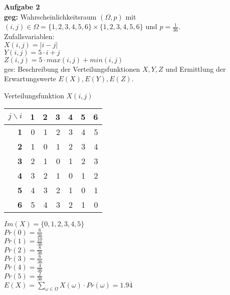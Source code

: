 \documentclass[a4paper]{scrartcl}
\begin{document}
	\begin{flushleft}
		\textbf{Aufgabe 2}\\
		\textbf{geg:} Wahrscheinlichkeitsraum $(\Omega,p)$ mit $(i,j)\in \Omega=\{1,2,3,4,5,6\}\times\{1,2,3,4,5,6\}$ und $p=\frac{1}{36}$.\\
		Zufallsvariablen:\\
		$X(i,j)=|i-j|$\\
		$Y(i,j)=5\cdot i+j$\\
		$Z(i,j)=5\cdot max(i,j)+min(i,j)$\\[1em]
		ges: Beschreibung der Verteilungsfunktionen $X,Y,Z$ und Ermittlung der Erwartungswerte $E(X),E(Y),E(Z)$.\\[1em]
		
		\begin{center}
		Verteilungsfunktion $X(i,j)$\\
		\begin{tabular}{|r|r|r|r|r|r|r|}
		\hline
		\multicolumn{1}{|c|}{$j\backslash i$} & \multicolumn{1}{c|}{\textbf{1}} & \multicolumn{1}{c|}{\textbf{2}} & \multicolumn{1}{c|}{\textbf{3}} & \multicolumn{1}{c|}{\textbf{4}} & \multicolumn{1}{c|}{\textbf{5}} & \multicolumn{1}{c|}{\textbf{6}} \\ \hline
		\textbf{1} & 0 & 1 & 2 & 3 & 4 & 5 \\ \hline
		\textbf{2} & 1 & 0 & 1 & 2 & 3 & 4 \\ \hline
		\textbf{3} & 2 & 1 & 0 & 1 & 2 & 3 \\ \hline
		\textbf{4} & 3 & 2 & 1 & 0 & 1 & 2 \\ \hline
		\textbf{5} & 4 & 3 & 2 & 1 & 0 & 1 \\ \hline
		\textbf{6} & 5 & 4 & 3 & 2 & 1 & 0 \\ \hline
		\end{tabular}
		\end{center}
		$Im(X)=\{0,1,2,3,4,5\}$\\
		$Pr(0) = \frac{6}{36}$\\
		$Pr(1) = \frac{10}{36}$\\
		$Pr(2) = \frac{8}{36}$\\
		$Pr(3) = \frac{6}{36}$\\
		$Pr(4) = \frac{4}{36}$\\
		$Pr(5) = \frac{2}{36}$\\
		$E(X)=\sum\limits_{\omega\in\Omega} X(\omega)\cdot Pr(\omega) = 1.9\overline{4}$\\[1em]


\end{flushleft}
\end{document}
